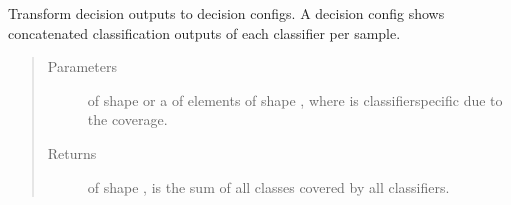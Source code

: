 \documentclass[letterpaper,10pt,english]{sphinxmanual}
\begin{document}
\begin{fulllineitems}
\label{\detokenize{pusion.util.transformer:pusion.util.transformer.decision_tensor_to_configs}}
\sphinxAtStartPar
Transform decision outputs to decision configs. A decision config shows concatenated classification outputs of each
classifier per sample.
\begin{quote}\begin{description}
\item[{Parameters}] \leavevmode
\sphinxAtStartPar
{} \textendash{}  of shape  or a  of
 elements of shape , where  is classifier\sphinxhyphen{}specific
due to the coverage.

\item[{Returns}] \leavevmode
\sphinxAtStartPar
{} of shape ,  is the sum of all classes covered by
all classifiers.

\end{description}\end{quote}

\end{fulllineitems}

\end{document}

